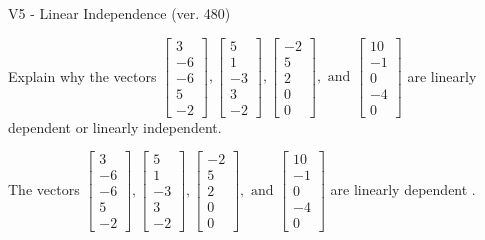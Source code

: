 \begin{exercise}
  \begin{exerciseTitle}V5 - Linear Independence (ver. 480)\end{exerciseTitle}
  \begin{exerciseStatement}
    Explain why the vectors \(\left[\begin{array}{r}
3 \\
-6 \\
-6 \\
5 \\
-2
\end{array}\right] , \left[\begin{array}{r}
5 \\
1 \\
-3 \\
3 \\
-2
\end{array}\right] , \left[\begin{array}{r}
-2 \\
5 \\
2 \\
0 \\
0
\end{array}\right] , \text{ and } \left[\begin{array}{r}
10 \\
-1 \\
0 \\
-4 \\
0
\end{array}\right]\) are linearly dependent or linearly independent.	


  \end{exerciseStatement}
  \begin{exerciseAnswer}
   The vectors \(\left[\begin{array}{r}
3 \\
-6 \\
-6 \\
5 \\
-2
\end{array}\right] , \left[\begin{array}{r}
5 \\
1 \\
-3 \\
3 \\
-2
\end{array}\right] , \left[\begin{array}{r}
-2 \\
5 \\
2 \\
0 \\
0
\end{array}\right] , \text{ and } \left[\begin{array}{r}
10 \\
-1 \\
0 \\
-4 \\
0
\end{array}\right]\) are 
  	 linearly dependent  .
  


  \end{exerciseAnswer}
\end{exercise}